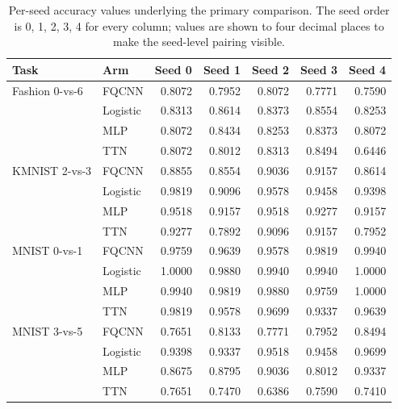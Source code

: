 \documentclass[conference]{IEEEtran}
\begin{document}
\begin{table}[!t]
\caption{Per-seed accuracy values underlying the primary comparison. The seed order is 0, 1, 2, 3, 4 for every column; values are shown to four decimal places to make the seed-level pairing visible.}
\label{tab:seedvalues}
\centering
\small
\begin{tabular}{@{}llrrrrr@{}}
\toprule
\textbf{Task} & \textbf{Arm} & \textbf{Seed 0} & \textbf{Seed 1} & \textbf{Seed 2} & \textbf{Seed 3} & \textbf{Seed 4} \\
\midrule
Fashion 0-vs-6 & FQCNN & 0.8072 & 0.7952 & 0.8072 & 0.7771 & 0.7590 \\
 & Logistic & 0.8313 & 0.8614 & 0.8373 & 0.8554 & 0.8253 \\
 & MLP & 0.8072 & 0.8434 & 0.8253 & 0.8373 & 0.8072 \\
 & TTN & 0.8072 & 0.8012 & 0.8313 & 0.8494 & 0.6446 \\
\addlinespace
KMNIST 2-vs-3 & FQCNN & 0.8855 & 0.8554 & 0.9036 & 0.9157 & 0.8614 \\
 & Logistic & 0.9819 & 0.9096 & 0.9578 & 0.9458 & 0.9398 \\
 & MLP & 0.9518 & 0.9157 & 0.9518 & 0.9277 & 0.9157 \\
 & TTN & 0.9277 & 0.7892 & 0.9096 & 0.9157 & 0.7952 \\
\addlinespace
MNIST 0-vs-1 & FQCNN & 0.9759 & 0.9639 & 0.9578 & 0.9819 & 0.9940 \\
 & Logistic & 1.0000 & 0.9880 & 0.9940 & 0.9940 & 1.0000 \\
 & MLP & 0.9940 & 0.9819 & 0.9880 & 0.9759 & 1.0000 \\
 & TTN & 0.9819 & 0.9578 & 0.9699 & 0.9337 & 0.9639 \\
\addlinespace
MNIST 3-vs-5 & FQCNN & 0.7651 & 0.8133 & 0.7771 & 0.7952 & 0.8494 \\
 & Logistic & 0.9398 & 0.9337 & 0.9518 & 0.9458 & 0.9699 \\
 & MLP & 0.8675 & 0.8795 & 0.9036 & 0.8012 & 0.9337 \\
 & TTN & 0.7651 & 0.7470 & 0.6386 & 0.7590 & 0.7410 \\
\bottomrule
\end{tabular}
\end{table}
\end{document}
